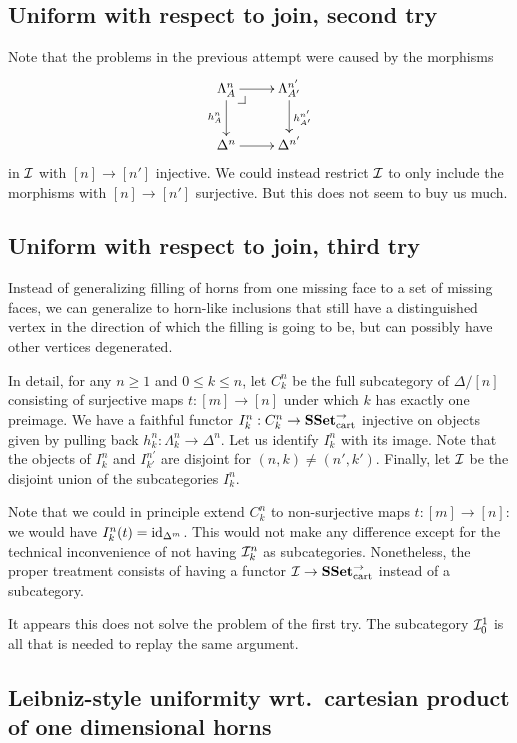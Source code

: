 \documentclass[reqno,10pt,a4paper,oneside]{amsart}
\begin{document}
\subsection*{Uniform with respect to join, second try}

Note that the problems in the previous attempt were caused by the morphisms
\[
\xymatrix{
  \Lambda_A^n
  \ar[r]
  \ar[d]_{h_A^n}
  \pullback{dr}
&
  \Lambda_{A'}^{n'}
  \ar[d]^{h_{A'}^{n'}}
\\
  \Delta^{n}
  \ar[r]
&
  \Delta^{n'}
}
\] 
in $\cal{I}$ with $[n] \to [n']$ injective.
We could instead restrict $\cal{I}$ to only include the morphisms with $[n] \to [n']$ surjective.
But this does not seem to buy us much.

\subsection*{Uniform with respect to join, third try}

Instead of generalizing filling of horns from one missing face to a set of missing faces, we can generalize to horn-like inclusions that still have a distinguished vertex in the direction of which the filling is going to be, but can possibly have other vertices degenerated.

In detail, for any $n \geq 1$ and $0 \leq k \leq n$, let $C_k^n$ be the full subcategory of $\Delta/[n]$ consisting of surjective maps $t : [m] \to [n]$ under which $k$ has exactly one preimage.
We have a faithful functor $I_k^n : C_k^n \to \SSet_{\text{cart}}^{\to}$ injective on objects given by pulling back $h_k^n : \Lambda_k^n \to \Delta^n$.
Let us identify $I_k^n$ with its image.
Note that the objects of $I_k^n$ and $I_{k'}^{n'}$ are disjoint for $(n, k) \neq (n', k')$.
Finally, let $\cal{I}$ be the disjoint union of the subcategories $I_k^n$.

Note that we could in principle extend $C_k^n$ to non-surjective maps $t : [m] \to [n]$: we would have $I_k^n(t) = \id_{\Delta^m}$.
This would not make any difference except for the technical inconvenience of not having $\cal{I}_k^n$ as subcategories.
Nonetheless, the proper treatment consists of having a functor $\cal{I} \to \SSet_{\text{cart}}^{\to}$ instead of a subcategory.

It appears this does not solve the problem of the first try.
The subcategory $\cal{I}_0^1$ is all that is needed to replay the same argument.

\subsection*{Leibniz-style uniformity wrt.\ cartesian product of one dimensional horns}
\end{document}
